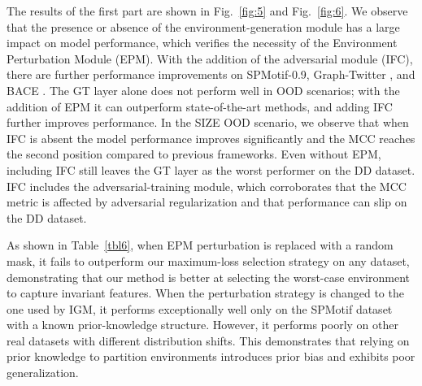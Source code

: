 \documentclass[a4paper,fleqn]{cas-dc}
\begin{document}
The results of the first part are shown in Fig.~\ref{fig:5} and Fig.~\ref{fig:6}. We observe that the presence or absence of the environment-generation module has a large impact on model performance, which verifies the necessity of the Environment Perturbation Module (EPM). With the addition of the adversarial module (IFC), there are further performance improvements on SPMotif-0.9, Graph-Twitter \cite{dong2014adaptive}, and BACE \cite{hu2020open}. The GT layer alone \cite{dwivedi2021generalization} does not perform well in OOD scenarios; with the addition of EPM it can outperform state-of-the-art methods, and adding IFC further improves performance. In the SIZE OOD scenario, we observe that when IFC is absent the model performance improves significantly and the MCC reaches the second position compared to previous frameworks. Even without EPM, including IFC still leaves the GT layer \cite{dwivedi2021generalization} as the worst performer on the DD \cite{Morris+2020} dataset. IFC includes the adversarial-training module, which corroborates that the MCC metric is affected by adversarial regularization and that performance can slip on the DD \cite{Morris+2020} dataset.

As shown in Table~\ref{tbl6}, when EPM perturbation is replaced with a random mask, it fails to outperform our maximum-loss selection strategy on any dataset, demonstrating that our method is better at selecting the worst-case environment to capture invariant features. When the perturbation strategy is changed to the one used by IGM, it performs exceptionally well only on the SPMotif dataset with a known prior-knowledge structure. However, it performs poorly on other real datasets with different distribution shifts. This demonstrates that relying on prior knowledge to partition environments introduces prior bias and exhibits poor generalization.
\end{document}
